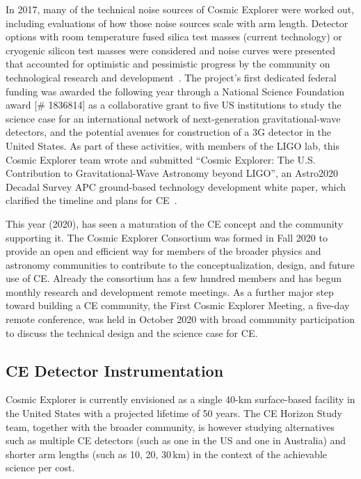 \documentclass[graybox, nosecnum]{svmult}
\begin{document}
In 2017, many of the technical noise sources of Cosmic Explorer were worked out, including evaluations of how those noise sources scale with arm length. Detector options with room temperature fused silica test masses (current technology) or cryogenic silicon test masses were considered and noise curves were presented that accounted for optimistic and pessimistic progress by the community on technological research and development~\cite{CE2017}. The project's first dedicated federal funding was awarded the following year through a National Science Foundation award [\# 1836814] as a collaborative grant to five US institutions to study the science case for an international network of next-generation gravitational-wave detectors, and the potential avenues for construction of a 3G detector in the United States. As part of these activities, with members of the LIGO lab, this Cosmic Explorer team wrote and submitted ``Cosmic Explorer: The U.S. Contribution to Gravitational-Wave Astronomy beyond LIGO'', an Astro2020 Decadal Survey APC ground-based technology development white paper, which clarified the timeline and plans for CE~\cite{CE-Astro2020}.

This year (2020), has seen a maturation of the CE concept and the community supporting it. The Cosmic Explorer Consortium was formed in Fall 2020 to provide an open and efficient way for members of the broader physics and astronomy communities to contribute to the conceptualization, design, and future use of CE. Already the consortium has a few hundred members and has begun monthly research and development remote meetings. As a further major step toward building a CE community, the First Cosmic Explorer Meeting, a five-day remote conference, was held in October 2020 with broad community participation to discuss the technical design and the science case for CE. 

\subsection{CE Detector Instrumentation}

Cosmic Explorer is currently envisioned as a single 40-km surface-based facility in the United States with a projected lifetime of 50 years. The CE Horizon Study team, together with the broader community, is however studying alternatives such as multiple CE detectors (such as one in the US and one in Australia) and shorter arm lengths (such as 10, 20, 30\,km) in the context of the achievable science per cost. 
\end{document}
